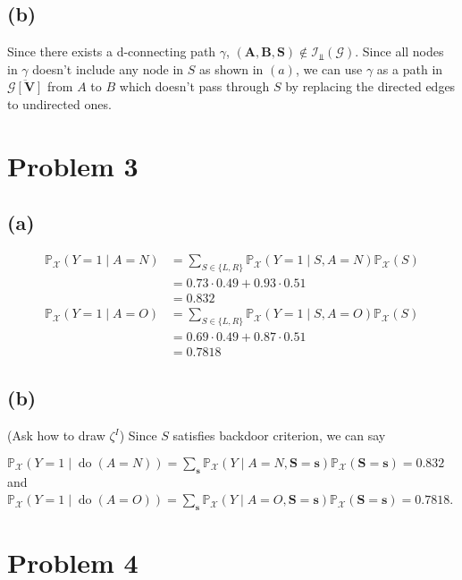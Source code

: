 \documentclass[10pt]{article}
\begin{document}
\subsection{(b)}

Since there exists a d-connecting path $\gamma$, 
$(\mathbf{A}, \mathbf{B}, \mathbf{S}) \notin \mathcal{I}_{\Perp}(\mathcal{G})$.
Since all nodes in $\gamma$ doesn't include any node in $S$ as shown in $(a)$, we can use $\gamma$ as a path in $\overline{\mathcal{G}[\mathbf{V}]}$ from $A$ to $B$ which doesn't pass through $S$ by replacing the directed edges to undirected ones.

\section{Problem 3}

\subsection{(a)}
\begin{align*}
    \mathbb{P}_{\mathcal{X}}(Y=1 \mid A=N) &= \sum_{S \in \{L, R\}}\mathbb{P}_{\mathcal{X}}(Y=1 \mid S, A=N) \mathbb{P}_{\mathcal{X}}(S)\\   
    &= 0.73 \cdot 0.49 + 0.93 \cdot  0.51 \\
    &= 0.832\\
    \mathbb{P}_{\mathcal{X}}(Y=1 \mid A=O) &= \sum_{S \in \{L, R\}}\mathbb{P}_{\mathcal{X}}(Y=1 \mid S, A=O) \mathbb{P}_{\mathcal{X}}(S)\\   
    &= 0.69 \cdot 0.49 + 0.87 \cdot  0.51 \\
    &= 0.7818
\end{align*}

\subsection{(b)}
(Ask how to draw $\zeta^I$)
Since $S$ satisfies backdoor criterion,  we can say 

$\mathbb{P}_{\mathcal{X}}(Y=1 \mid \operatorname{do}(A=N)) = \sum_{\mathbf{s}} \mathbb{P}_{\mathcal{X}}(Y \mid A=N, \mathbf{S}=\mathbf{s}) \mathbb{P}_{\mathcal{X}}(\mathbf{S}=\mathbf{s})=0.832$ and 
$\mathbb{P}_{\mathcal{X}}(Y=1 \mid \operatorname{do}(A=O)) = \sum_{\mathbf{s}} \mathbb{P}_{\mathcal{X}}(Y \mid A=O, \mathbf{S}=\mathbf{s}) \mathbb{P}_{\mathcal{X}}(\mathbf{S}=\mathbf{s})=0.7818$.

\section{Problem 4}
\end{document}
